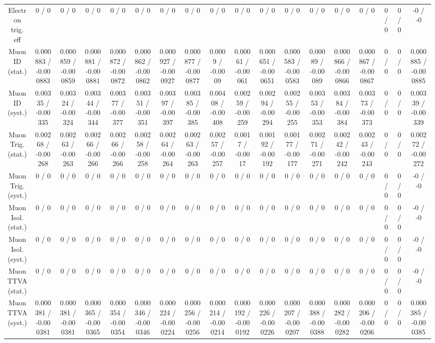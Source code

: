 \documentclass[10pt]{article}
\begin{document}
\begin{table}[htbp]
\begin{center}
\begin{tabular}{|c|c|c|c|c|c|c|c|c|c|c|c|c|c|c|c|c|c|}
  Electron trig. eff & 0 / 0 & 0 / 0 & 0 / 0 & 0 / 0 & 0 / 0 & 0 / 0 & 0 / 0 & 0 / 0 & 0 / 0 & 0 / 0 & 0 / 0 & 0 / 0 & 0 / 0 & 0 / 0 & 0 / 0 & 0 / 0 & -0 / -0 \\ 
  Muon ID (stat.) & 0.000883 / -0.000883 & 0.000859 / -0.000859 & 0.000881 / -0.000881 & 0.000872 / -0.000872 & 0.000862 / -0.000862 & 0.000927 / -0.000927 & 0.000877 / -0.000877 & 0.0009 / -0.0009 & 0.00061 / -0.00061 & 0.000651 / -0.000651 & 0.000583 / -0.000583 & 0.00089 / -0.00089 & 0.000866 / -0.000866 & 0.000867 / -0.000867 & 0 / 0 & 0 / 0 & 0.000885 / -0.000885 \\ 
  Muon ID (syst.) & 0.00335 / -0.00335 & 0.00324 / -0.00324 & 0.00344 / -0.00344 & 0.00377 / -0.00377 & 0.00351 / -0.00351 & 0.00397 / -0.00397 & 0.00385 / -0.00385 & 0.00408 / -0.00408 & 0.00259 / -0.00259 & 0.00294 / -0.00294 & 0.00255 / -0.00255 & 0.00353 / -0.00353 & 0.00384 / -0.00384 & 0.00373 / -0.00373 & 0 / 0 & 0 / 0 & 0.00339 / -0.00339 \\ 
  Muon Trig. (stat.) & 0.00268 / -0.00268 & 0.00263 / -0.00263 & 0.00266 / -0.00266 & 0.00266 / -0.00266 & 0.00258 / -0.00258 & 0.00264 / -0.00264 & 0.00263 / -0.00263 & 0.00257 / -0.00257 & 0.0017 / -0.0017 & 0.00192 / -0.00192 & 0.00177 / -0.00177 & 0.00271 / -0.00271 & 0.00242 / -0.00242 & 0.00243 / -0.00243 & 0 / 0 & 0 / 0 & 0.00272 / -0.00272 \\ 
  Muon Trig. (syst.) & 0 / 0 & 0 / 0 & 0 / 0 & 0 / 0 & 0 / 0 & 0 / 0 & 0 / 0 & 0 / 0 & 0 / 0 & 0 / 0 & 0 / 0 & 0 / 0 & 0 / 0 & 0 / 0 & 0 / 0 & 0 / 0 & -0 / -0 \\ 
  Muon Isol. (stat.) & 0 / 0 & 0 / 0 & 0 / 0 & 0 / 0 & 0 / 0 & 0 / 0 & 0 / 0 & 0 / 0 & 0 / 0 & 0 / 0 & 0 / 0 & 0 / 0 & 0 / 0 & 0 / 0 & 0 / 0 & 0 / 0 & -0 / -0 \\ 
  Muon Isol. (syst.) & 0 / 0 & 0 / 0 & 0 / 0 & 0 / 0 & 0 / 0 & 0 / 0 & 0 / 0 & 0 / 0 & 0 / 0 & 0 / 0 & 0 / 0 & 0 / 0 & 0 / 0 & 0 / 0 & 0 / 0 & 0 / 0 & -0 / -0 \\ 
  Muon TTVA (stat.) & 0 / 0 & 0 / 0 & 0 / 0 & 0 / 0 & 0 / 0 & 0 / 0 & 0 / 0 & 0 / 0 & 0 / 0 & 0 / 0 & 0 / 0 & 0 / 0 & 0 / 0 & 0 / 0 & 0 / 0 & 0 / 0 & -0 / -0 \\ 
  Muon TTVA (syst.) & 0.000381 / -0.000381 & 0.000381 / -0.000381 & 0.000365 / -0.000365 & 0.000354 / -0.000354 & 0.000346 / -0.000346 & 0.000224 / -0.000224 & 0.000256 / -0.000256 & 0.000214 / -0.000214 & 0.000192 / -0.000192 & 0.000226 / -0.000226 & 0.000207 / -0.000207 & 0.000388 / -0.000388 & 0.000282 / -0.000282 & 0.000206 / -0.000206 & 0 / 0 & 0 / 0 & 0.000385 / -0.000385 \\ 

\end{tabular}
\end{center}
\end{table}
\end{document}

